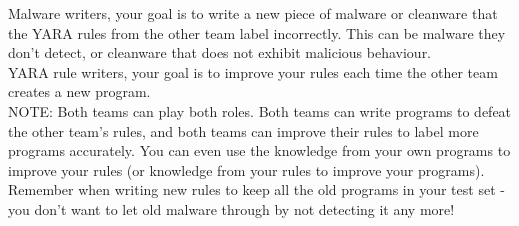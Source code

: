 \documentclass{article}
\begin{document}
\noindent Malware writers, your goal is to write a new piece of malware or cleanware
that the YARA rules from the other team label incorrectly. This can be
malware they don't detect, or cleanware that does not exhibit malicious
behaviour.\\

\noindent YARA rule writers, your goal is to improve your rules each time the other
team creates a new program.\\

\noindent NOTE: Both teams can play both roles. Both teams can write programs
to defeat the other team's rules, and both teams can improve their rules
to label more programs accurately. You can even use the knowledge from
your own programs to improve your rules (or knowledge from your rules to
improve your programs).\\

\noindent Remember when writing new rules to keep all the old programs in your
test set - you don't want to let old malware through by not detecting it any
more!
% 
% 
\end{document}
